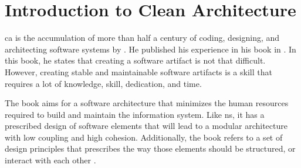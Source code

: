 \section{Introduction to Clean Architecture} \label{sec_into_ca}

\gls{ca} is the accumulation of more than half a century of coding, designing, and
architecting software systems by \citeauthor*[]{robert_c_martin_clean_2018}. He published
his experience in his book  in
\citeyear[]{robert_c_martin_clean_2018}. In this book, he states that creating a software
artifact is not that difficult. However, creating stable and maintainable software
artifacts is a skill that requires a lot of knowledge, skill, dedication, and time.

The book aims for a software architecture that minimizes the human resources required to
build and maintain the information system. Like \gls{ns}, it has a prescribed design of
software elements that will lead to a modular architecture with low coupling and high
cohesion. Additionally, the book refers to a set of design principles that prescribes the
way those elements should be structured, or interact with each other
\parencite{robert_c_martin_clean_2018}.
